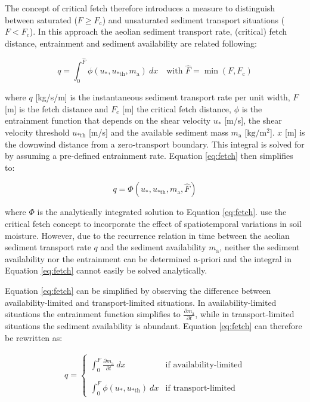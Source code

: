 The concept of critical fetch therefore introduces a measure to
distinguish between saturated ($ F \ge F_{\mathrm{c}}$) and
unsaturated sediment transport situations ($F < F_{\mathrm{c}}$). In
this approach the aeolian sediment transport rate, (critical) fetch
distance, entrainment and sediment availability are related following:

\begin{equation}
\label{eq:fetch}
q = \int_0^{\hat{F}} \phi (u_{\mathrm{*}}, u_{\mathrm{* th}}, m_{\mathrm{a}}) ~ d x \quad \textrm{with } \hat{F} = \min(F, F_{\mathrm{c}})
\end{equation}

\noindent where $q$ [kg/s/m] is the instantaneous sediment transport
rate per unit width, $F$ [m] is the fetch distance and
$F_{\mathrm{c}}$ [m] the critical fetch distance, $\phi$ is the
entrainment function that depends on the shear velocity
$u_{\mathrm{*}}$ [m/s], the shear velocity threshold
$u_{\mathrm{* th}}$ [m/s] and the available sediment mass
$m_{\mathrm{a}}$ [$\mathrm{kg/m^2}$]. $x$ [m] is the downwind distance
from a zero-transport boundary. This integral is solved for by
assuming a pre-defined entrainment rate. Equation \ref{eq:fetch} then
simplifies to:

\begin{equation}
  q = \Phi (u_{\mathrm{*}}, u_{\mathrm{* th}}, m_{\mathrm{a}}, \hat{F})
\end{equation}

\noindent where $\Phi$ is the analytically integrated solution to
Equation \ref{eq:fetch}. \citet{DelgadoFernandez2011} use the critical
fetch concept to incorporate the effect of spatiotemporal variations
in soil moisture. However, due to the recurrence relation in time
between the aeolian sediment transport rate $q$ and the sediment
availability $m_{\mathrm{a}}$, neither the sediment availability nor
the entrainment can be determined a-priori and the integral in
Equation \ref{eq:fetch} cannot easily be solved analytically.

Equation \ref{eq:fetch} can be simplified by observing the difference
between availability-limited and transport-limited situations. In
availability-limited situations the entrainment function simplifies to
$\frac{\partial m_{\mathrm{a}}}{\partial t}$, while in
transport-limited situations the sediment availability is
abundant. Equation \ref{eq:fetch} can therefore be rewritten as:

\begin{eqnarray}
\label{eq:fetch_decomposed}
  q = \left \{
  \begin{array}{ll}
    \int_0^{\hat{F}} \frac{\partial m_{\mathrm{a}}}{\partial t} ~ d x & \textrm{if availability-limited} \\ 
    ~ & ~ \\
    \int_0^{\hat{F}} \phi (u_{\mathrm{*}}, u_{\mathrm{* th}}) ~ d x & \textrm{if transport-limited}
  \end{array}
  \right.
\end{eqnarray}


